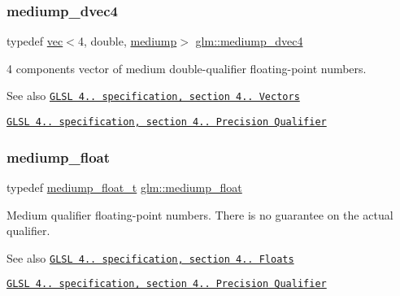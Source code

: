 \subsubsection{\texorpdfstring{mediump\+\_\+dvec4}{mediump\_dvec4}}
{\footnotesize\ttfamily typedef \mbox{\hyperlink{structglm_1_1vec}{vec}}$<$4, double, \mbox{\hyperlink{namespaceglm_a36ed105b07c7746804d7fdc7cc90ff25a6416f3ea0c9025fb21ed50c4d6620482}{mediump}}$>$ \mbox{\hyperlink{group__core__precision_ga860fd4068c3e89885f814e3b8f312f2f}{glm\+::mediump\+\_\+dvec4}}}

4 components vector of medium double-\/qualifier floating-\/point numbers.

\begin{DoxySeeAlso}{See also}
\href{http://www.opengl.org/registry/doc/GLSLangSpec.4.20.8.pdf}{\tt G\+L\+SL 4.. specification, section 4.. Vectors} 

\href{http://www.opengl.org/registry/doc/GLSLangSpec.4.20.8.pdf}{\tt G\+L\+SL 4.. specification, section 4.. Precision Qualifier} 
\end{DoxySeeAlso}
\mbox{\label{group__core__precision_gac785826c039fe6c97c03b37c81c1a68e}} 
\subsubsection{\texorpdfstring{mediump\+\_\+float}{mediump\_float}}
{\footnotesize\ttfamily typedef \mbox{\hyperlink{namespaceglm_aec127979a2b6edbf05b485cb4e8c47cc}{mediump\+\_\+float\+\_\+t}} \mbox{\hyperlink{group__core__precision_gac785826c039fe6c97c03b37c81c1a68e}{glm\+::mediump\+\_\+float}}}

Medium qualifier floating-\/point numbers. There is no guarantee on the actual qualifier.

\begin{DoxySeeAlso}{See also}
\href{http://www.opengl.org/registry/doc/GLSLangSpec.4.20.8.pdf}{\tt G\+L\+SL 4.. specification, section 4.. Floats} 

\href{http://www.opengl.org/registry/doc/GLSLangSpec.4.20.8.pdf}{\tt G\+L\+SL 4.. specification, section 4.. Precision Qualifier} 
\end{DoxySeeAlso}
\mbox{\label{group__core__precision_ga2a3dcbcd7f4e17663d393a12061ac6ac}} 
